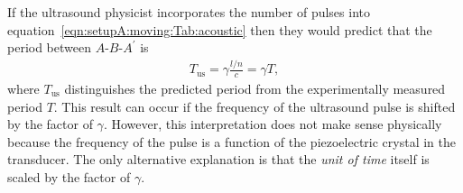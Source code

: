 \documentclass[10pt, fleqn,final,showtrims,oldfontcommands, article,a4paper,oneside]{memoir} %
\newcommand{\eqnref}[1]{\ref{eqn:#1}}
\newcommand{\lr}[1]{\left( #1 \right)}
\newcommand{\us}{{\text{us}}}
\begin{document}
If the ultrasound physicist incorporates the  number of pulses into  equation~\ref{eqn:setupA:moving:Tab:acoustic}
then they would predict that the  period between $A$-$B$-$A^\prime$ is
\begin{align}
 T_\us= \gamma \frac{l/n}{c} = \gamma T,
\end{align}
where $T_\us$ distinguishes the predicted period from the experimentally measured period $T$.
This result can occur  if the  frequency of the ultrasound pulse is shifted by the factor of $\gamma$.
However, this interpretation does not make sense physically because the frequency of the pulse is a function of the piezoelectric crystal in the transducer.
The only alternative explanation is that the {\em  unit of time} itself is scaled  by the factor of $\gamma$.












\end{document}
